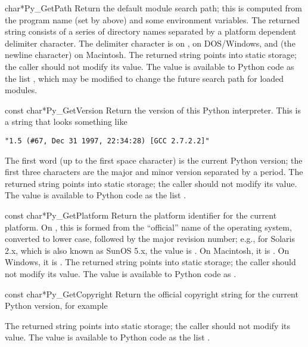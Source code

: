 \documentclass{manual}
\begin{document}
\begin{cfuncdesc}{char*}{Py_GetPath}{}
Return the default module search path; this is computed from the 
program name (set by  above) and some 
environment variables.  The returned string consists of a series of 
directory names separated by a platform dependent delimiter character.  
The delimiter character is \character{:} on \UNIX{}, \character{;} on
DOS/Windows, and \character{\\n} (the \ASCII{} newline character) on
Macintosh.  The returned string points into static storage; the caller
should not modify its value.  The value is available to Python code 
as the list , which may be modified to change the 
future search path for loaded modules.

\end{cfuncdesc}

\begin{cfuncdesc}{const char*}{Py_GetVersion}{}
Return the version of this Python interpreter.  This is a string that 
looks something like

\begin{verbatim}
"1.5 (#67, Dec 31 1997, 22:34:28) [GCC 2.7.2.2]"
\end{verbatim}

The first word (up to the first space character) is the current Python 
version; the first three characters are the major and minor version 
separated by a period.  The returned string points into static storage; 
the caller should not modify its value.  The value is available to 
Python code as the list .
\end{cfuncdesc}

\begin{cfuncdesc}{const char*}{Py_GetPlatform}{}
Return the platform identifier for the current platform.  On \UNIX{}, 
this is formed from the ``official'' name of the operating system, 
converted to lower case, followed by the major revision number; e.g., 
for Solaris 2.x, which is also known as SunOS 5.x, the value is 
.  On Macintosh, it is .  On Windows, it 
is .  The returned string points into static storage; 
the caller should not modify its value.  The value is available to 
Python code as .
\end{cfuncdesc}

\begin{cfuncdesc}{const char*}{Py_GetCopyright}{}
Return the official copyright string for the current Python version, 
for example


The returned string points into static storage; the caller should not 
modify its value.  The value is available to Python code as the list 
.
\end{cfuncdesc}
\end{document}
